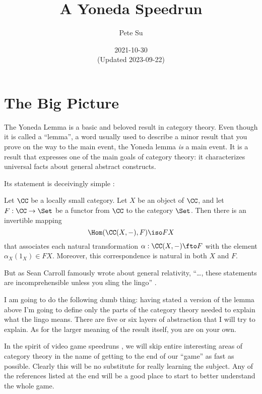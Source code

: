 
\usepackage{microtype}
\usepackage{datetime2}



\title{\Large A Yoneda Speedrun}
\author{\large Pete Su}
\date{\normalsize 2021-10-30 \\ {\footnotesize (Updated 2023-09-22)}}

\maketitle

\section{The Big Picture}

The Yoneda Lemma is a basic and beloved result in category theory. Even though it is
called a ``lemma'', a word usually used to describe a minor result that you prove on the
way to the main event, the Yoneda lemma {\it is} a main event. It is a result that
expresses one of the main goals of category theory: it characterizes universal facts about
general abstract constructs.

Its statement is deceivingly simple \cite{Riehl2016}:

\pg
Let $\CC$ be a locally small category. Let $X$ be an object of $\CC$, and let $F: \CC \to
\Set$ be a functor from $\CC$ to the category $\Set$. Then there is an invertible mapping
$$
\Hom(\CC(X, -),F) \iso FX
$$
that associates each natural transformation $\alpha:\CC(X,-) \fto F$ with the element
$\alpha_X(1_X) \in FX$. Moreover, this correspondence is natural in both $X$ and $F$.

\pg
But as Sean Carroll famously wrote about general relativity, ``\dots, these statements are
incomprehensible unless you sling the lingo'' \cite{carroll}.

I am going to do the following dumb thing: having stated a version of the lemma above I'm
going to define only the parts of the category theory needed to explain what the lingo
means. There are five or six layers of abstraction that I will 
try to explain. As for the larger meaning of the result itself, you are on your own. 

In the spirit of video game speedruns \cite{lobos}, we will skip entire interesting areas
of category theory in the name of getting to the end of our ``game'' as fast
as possible. Clearly this will be no substitute for really learning the subject. Any of
the references listed at the end will be a good place to start to better understand the
whole game.

